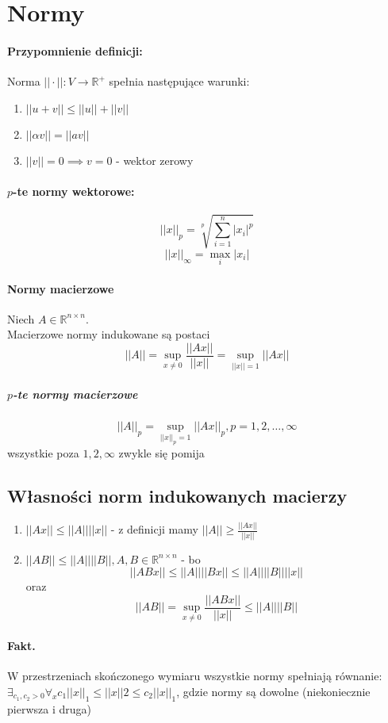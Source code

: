 \documentclass{article}
\begin{document}
\section{Normy}
\paragraph{Przypomnienie definicji: } Norma $ ||\cdot||: V\rightarrow\mathbb{R}^+$ spełnia następujące warunki:
\begin{enumerate}
	\item $||u+v||\leq||u||+||v||$
	\item $||\alpha v||=||av||$
	\item $||v||=0\implies v=0$ - wektor zerowy
\end{enumerate}
\paragraph{$p$-te normy wektorowe:}
$$||x||_p = \sqrt[p]{\sum_{i=1}^{n}|x_i|^p}$$
$$||x||_\infty = \max_i |x_i|$$
\paragraph{Normy macierzowe}
Niech $A\in \mathbb{R}^{n\times n}$.\\
Macierzowe normy indukowane są postaci
$$||A||=\sup_{x\not=0}\frac{||Ax||}{||x||}=\sup_{||x||=1}||Ax||$$
\subparagraph{$p$-te normy macierzowe}
$$||A||_p=\sup_{||x||_p=1}||Ax||_p, p=1, 2, \ldots, \infty$$
wszystkie poza $1, 2, \infty$ zwykle się pomija
\subsection{Własności norm indukowanych macierzy}
\begin{enumerate}
	\item $||Ax||\leq||A||||x||$ - z definicji mamy $ ||A||\geq\frac{||Ax||}{||x||} $
	\item $ ||AB||\leq||A||||B||, A,B\in \mathbb{R}^{n\times n} $ - bo
	$$ ||ABx||\leq||A||||Bx||\leq||A||||B||||x|| $$ oraz
	$$ ||AB||=\sup_{x\not=0}\frac{||ABx||}{||x||}\leq||A||||B|| $$
\end{enumerate}
\paragraph{Fakt.} W przestrzeniach skończonego wymiaru wszystkie normy spełniają równanie:
$ \exists_{c_1, c_2>0}\forall_{x}c_1||x||_1\leq||x||2\leq c_2||x||_1 $, gdzie normy są dowolne (niekoniecznie pierwsza i druga)
\end{document}
